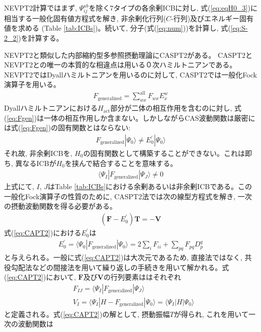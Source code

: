 \documentclass[11pt,pra,aps]{revtex4}
\begin{document}
NEVPT2計算ではまず, $\Psi_{ij}^{ab}$を除く7タイプの各余剰ICBに対し, 式(\ref{eq:eqH0_3})に相当する一般化固有値方程式を解き, 非余剰化行列($C$-行列)及びエネルギー固有値を求める (Table \ref{tab:ICBs})。続いて, 分子(式(\ref{eq:num}))を計算し, 式(\ref{eq:S-2_2})を計算する。

NEVPT2と類似した内部縮約型多参照摂動理論にCASPT2がある。\cite{doi:10.1021/j100377a012,doi:10.1063/1.462209} CASPT2とNEVPT2との唯一の本質的な相違点は用いる０次ハミルトニアンである。NEVPT2ではDyallハミルトニアンを用いるのに対して, CASPT2では一般化Fock演算子を用いる。
\begin{align}
  F_\text{generalized}=\sum_{wx}^\text{all} F_{wx} E^w_x \label{eq:Fgen}
\end{align}
Dyallハミルトニアンにおける$H_\text{act}$部分が二体の相互作用を含むのに対し, 式(\ref{eq:Fgen})は一体の相互作用しか含まない。しかしながらCAS波動関数は厳密には式(\ref{eq:Fgen})の固有関数とはならない:
\begin{align}
  F_\text{generalized}|\Psi_0\rangle \neq E_0^{'} |\Psi_0\rangle \label{eq:Fgen-eig}
\end{align}
それ故, 非余剰ICBを, $H_0$の固有関数として構築することができない。これは即ち, 異なるICBが$H_0$を挟んで結合することを意味する。
\begin{align}
  \langle \Psi_I|F_\text{generalized}|\Psi_J\rangle\neq0 \label{eq:coupling}
\end{align}
上式にて, $I$, $J$はTable \ref{tab:ICBs}における余剰あるいは非余剰ICBである。この一般化Fock演算子の性質のために, CASPT2法では次の線型方程式を解き, 一次の摂動波動関数を得る必要がある。
\begin{align}
  \left(\mathbf{F}-E^{'}_0\right)\mathbf{T}=-\mathbf{V} \label{eq:CAPT2}
\end{align}
式(\ref{eq:CAPT2})における$E_0^{'}$は
\begin{align}
  E_0^{'}=\langle\Psi_0|F_\text{generalized}|\Psi_0\rangle=2\sum_i F_{ii}+\sum_{pq} F_{pq} D_p^q
\end{align}
と与えられる。一般に式(\ref{eq:CAPT2})は大次元であるため, 直接法ではなく, 共役勾配法などの間接法を用いて繰り返しの手続きを用いて解かれる。式(\ref{eq:CAPT2})において, $\mathbf{F}$及び$\mathbf{V}$の行列要素ははそれぞれ
\begin{align}
  &F_{IJ}=\langle\Psi_I|F_\text{generalized}|\Psi_J\rangle \label{eq:fij} \\
  &V_{I} =\langle\Psi_I|H-F_\text{generalized}|\Psi_0\rangle = \langle\Psi_I|H|\Psi_0\rangle
\end{align}
と定義される。式(\ref{eq:CAPT2})の解として, 摂動振幅$T$が得られ, これを用いて一次の波動関数は
\end{document}
